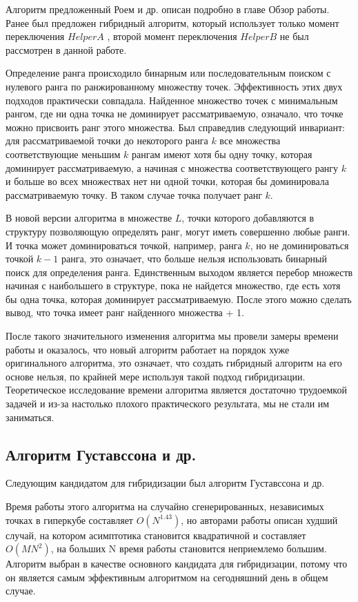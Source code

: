 Алгоритм предложенный Роем и др. описан подробно в главе Обзор работы. Ранее был предложен гибридный алгоритм, который использует только момент переключения $HelperA$ \cite{Markina}, второй момент переключения $HelperB$ не был рассмотрен в данной работе. 

Определение ранга происходило бинарным или последовательным поиском с нулевого ранга по ранжированному множеству точек. Эффективность этих двух подходов практически совпадала. Найденное множество точек с минимальным рангом, где ни одна точка не доминирует рассматриваемую, означало, что точке можно присвоить ранг этого множества. Был справедлив следующий инвариант: для рассматриваемой точки до некоторого ранга $k$ все множества соответствующие меньшим $k$ рангам имеют хотя бы одну точку, которая доминирует рассматриваемую, а начиная с множества соответствующего рангу $k$ и больше во всех множествах нет ни одной точки, которая бы доминировала рассматриваемую точку. В таком случае точка получает ранг $k$. 

В новой версии алгоритма в множестве $L$, точки которого добавляются в структуру позволяющую определять ранг, могут иметь совершенно любые ранги. И точка может доминироваться точкой, например, ранга $k$, но не доминироваться точкой $k-1$ ранга, это означает, что больше нельзя использовать бинарный поиск для определения ранга. Единственным выходом является перебор множеств начиная с наибольшего в структуре, пока не найдется множество, где есть хотя бы одна точка, которая доминирует рассматриваемую. После этого можно сделать вывод, что точка имеет ранг найденного множества + 1. 

После такого значительного изменения алгоритма мы провели замеры времени работы и оказалось, что новый алгоритм работает на порядок хуже оригинального алгоритма, это означает, что создать гибридный алгоритм на его основе нельзя, по крайней мере используя такой подход гибридизации. Теоретическое исследование времени алгоритма является достаточно трудоемкой задачей и из-за настолько плохого практического результата, мы не стали им заниматься. 

\subsection{Алгоритм Густавссона и др.}

Следующим кандидатом для гибридизации был алгоритм Густавссона и др. 

Время работы этого алгоритма на случайно сгенерированных, независимых точках в гиперкубе составляет $O(N^{1.43})$, но авторами работы описан худший случай, на котором асимптотика становится квадратичной и составляет $O(MN^2)$, на больших N время работы становится неприемлемо большим. Алгоритм выбран в качестве основного кандидата для гибридизации, потому что он является самым эффективным алгоритмом на сегодняшний день в общем случае. 


